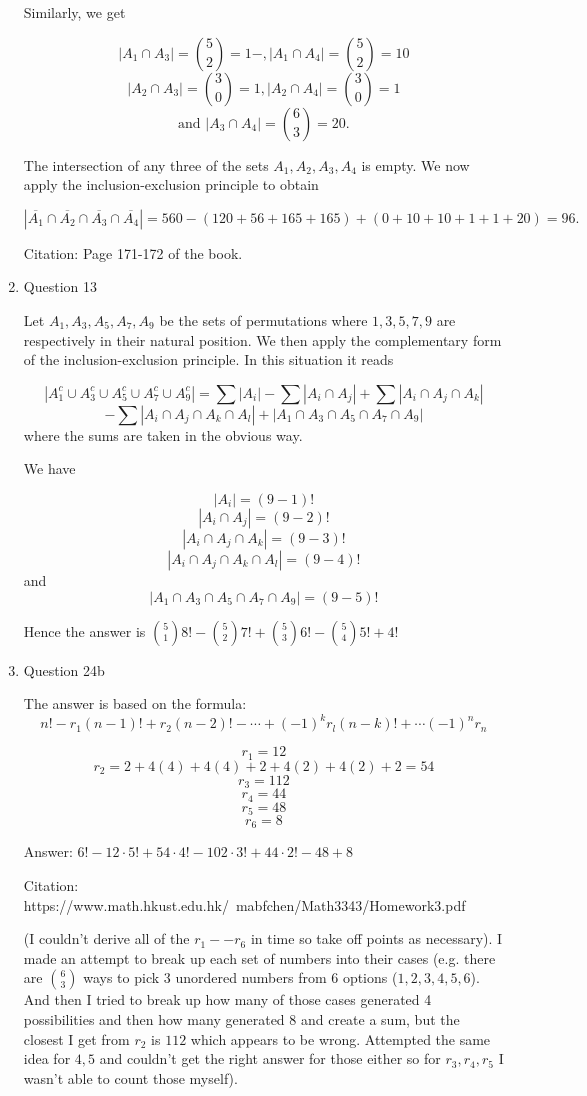 \documentclass[12pt]{exam}
\begin{document}
\begin{enumerate}
Similarly, we get 

$$|A_1 \cap A_3| = \binom{5}{2} = 1-, |A_1 \cap A_4| = \binom{5}{2} = 10$$
$$|A_2 \cap A_3| = \binom{3}{0} = 1, |A_2 \cap A_4| = \binom{3}{0} = 1$$
$$\text{and } |A_3 \cap A_4| = \binom{6}{3} = 20.$$

The intersection of any three of the sets $A_1, A_2, A_3, A_4$ is empty. We now apply the inclusion-exclusion principle to obtain

$$|\overline{A_1} \cap \overline{A_2} \cap \overline{A_3} \cap \overline{A_4}| = 560 - (120 + 56 + 165 + 165) + (0 + 10 + 10 + 1 + 1 + 20) = 96.$$

Citation: Page 171-172 of the book.

\item Question 13

Let $A_1, A_3, A_5, A_7, A_9$ be the sets of permutations where $1, 3, 5, 7, 9$ are respectively in their natural position. We then apply the complementary form of the inclusion-exclusion principle. In this situation it reads

$$|A_1^c \cup A_3^c \cup A_5^c \cup A_7^c \cup A_9^c| = \sum |A_i| - \sum |A_i \cap A_j| + \sum |A_i \cap A_j \cap A_k|$$ $$ - \sum | A_i \cap A_j \cap A_k \cap A_l| + |A_1 \cap A_3 \cap A_5 \cap A_7 \cap A_9|$$ where the sums are taken in the obvious way. 

We have

$$|A_i| = (9 - 1)!$$
$$|A_i \cap A_j| = (9 - 2)!$$
$$|A_i \cap A_j \cap A_k| = (9 - 3)!$$
$$|A_i \cap A_j \cap A_k \cap A_l| = (9 - 4)!$$
and 
$$|A_1 \cap A_3 \cap A_5 \cap A_7 \cap A_9| = (9 - 5)!$$

Hence the answer is $\binom{5}{1}8! - \binom{5}{2} 7! + \binom{5}{3} 6! - \binom{5}{4} 5! + 4!$

\item Question 24b

The answer is based on the formula: $$n! - r_1(n - 1)! + r_2(n - 2)! - \cdots + (-1)^kr_l(n -k)! + \cdots (-1)^nr_n$$

$$r_1 = 12$$ $$r_2 = 2 + 4(4) + 4(4) + 2 + 4(2) + 4(2) + 2 =  54$$ $$r_3 = 112$$ $$r_4 = 44$$ $$r_5 = 48$$ $$r_6 = 8$$

Answer: $6! - 12 \cdot 5! + 54 \cdot 4! - 102 \cdot 3! + 44 \cdot 2! - 48 + 8$

Citation: https://www.math.hkust.edu.hk/~mabfchen/Math3343/Homework3.pdf 

(I couldn't derive all of the $r_1 -- r_6$ in time so take off points as necessary). I made an attempt to break up each set of numbers into their cases (e.g. there are $\binom{6}{3}$ ways to pick 3 unordered numbers from 6 options ($1, 2, 3, 4, 5, 6$). And then I tried to break up how many of those cases generated 4 possibilities and then how many generated 8 and create a sum, but the closest I get from $r_2$ is $112$ which appears to be wrong. Attempted the same idea for $4, 5$ and couldn't get the right answer for those either so for $r_3, r_4, r_5$ I wasn't able to count those myself). 


\end{enumerate}
\end{document}
